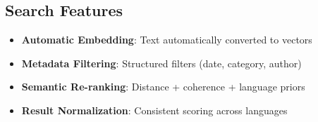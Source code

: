 \subsection{Search Features}

\begin{itemize}[noitemsep]
    \item \textbf{Automatic Embedding}: Text automatically converted to vectors
    \item \textbf{Metadata Filtering}: Structured filters (date, category, author)
    \item \textbf{Semantic Re-ranking}: Distance + coherence + language priors
    \item \textbf{Result Normalization}: Consistent scoring across languages
\end{itemize}
